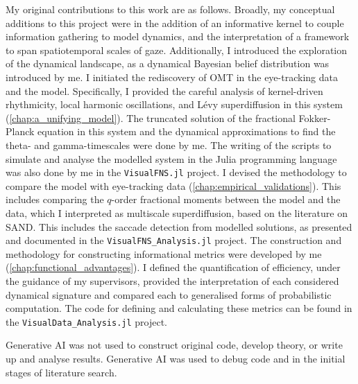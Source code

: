     My original contributions to this work are as follows. Broadly, my conceptual additions to this project were in the addition of an informative kernel to couple information gathering to model dynamics, and the interpretation of a framework to span spatiotemporal scales of gaze. Additionally, I introduced the exploration of the dynamical landscape, as a dynamical Bayesian belief distribution was introduced by me. I initiated the rediscovery of OMT in the eye-tracking data and the model. Specifically, I provided the careful analysis of kernel-driven rhythmicity, local harmonic oscillations, and Lévy superdiffusion in this system (\cref{chap:a_unifying_model}). The truncated solution of the fractional Fokker-Planck equation in this system and the dynamical approximations to find the theta- and gamma-timescales were done by me. The writing of the scripts to simulate and analyse the modelled system in the Julia programming language was also done by me in the \texttt{VisualFNS.jl} project. I devised the methodology to compare the model with eye-tracking data (\cref{chap:empirical_validations}). This includes comparing the $q$-order fractional moments between the model and the data, which I interpreted as multiscale superdiffusion, based on the literature on SAND. This includes the saccade detection from modelled solutions, as presented and documented in the \texttt{VisualFNS\_Analysis.jl} project. The construction and methodology for constructing informational metrics were developed by me (\cref{chap:functional_advantages}). I defined the quantification of efficiency, under the guidance of my supervisors, provided the interpretation of each considered dynamical signature and compared each to generalised forms of probabilistic computation. The code for defining and calculating these metrics can be found in the \texttt{VisualData\_Analysis.jl} project.

    Generative AI was not used to construct original code, develop theory, or write up and analyse results. Generative AI was used to debug code and in the initial stages of literature search.

\endgroup
\newpage %